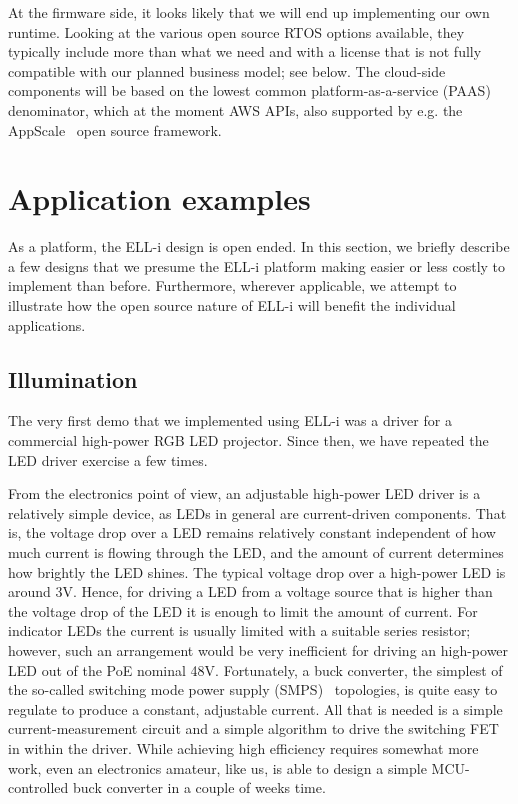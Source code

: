 \documentclass{siamltex}
\begin{document}
At the firmware side, it looks likely that we will end up implementing
our own runtime.  Looking at the various open source RTOS options
available, they typically include more than what we need and with a
license that is not fully compatible with our planned business model;
see below.  The cloud-side components will be based on the lowest
common platform-as-a-service (PAAS) denominator, which at the moment
AWS APIs, also supported by
e.g. the AppScale~\cite{chohan2010appscale} open source framework.


\section{Application examples}
\label{sec:examples}

As a platform, the ELL-i design is open ended.  In this section, we
briefly describe a few designs that we presume the ELL-i platform
making easier or less costly to implement than before.  Furthermore,
wherever applicable, we attempt to illustrate how the open source
nature of ELL-i will benefit the individual applications.

\subsection{Illumination}

The very first demo that we implemented using ELL-i was a driver for a
commercial high-power RGB LED
projector.  Since then, we have repeated the LED driver exercise a few
times.

From the electronics point of view, an adjustable high-power LED driver is a
relatively simple device, as LEDs in general are current-driven
components.  That is, the voltage drop over a LED remains relatively
constant independent of how much current is flowing through the LED,
and the amount of current determines how brightly the LED shines.  The
typical voltage drop over a high-power LED is around 3V.  Hence, for driving a
LED from a voltage source that is higher than the voltage drop of the
LED it is enough to limit the amount of current.  For indicator LEDs
the current is usually limited with a suitable series resistor;
however, such an arrangement would be very inefficient for driving an
high-power LED out of the PoE nominal 48V.  Fortunately, a buck
converter, the simplest of the so-called
switching mode power supply (SMPS)~\cite{maniktala2012switching} topologies, 
is quite
easy to regulate to produce a constant, adjustable current.  All that
is needed is a simple current-measurement circuit and a simple
algorithm to drive the switching FET in within the driver.  While
achieving high efficiency requires somewhat more work, even an
electronics amateur, like us, is able to design a simple
MCU-controlled buck converter in a couple of weeks time.
\end{document}
